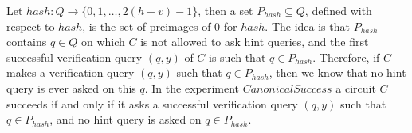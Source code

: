 
Let $hash:Q\rightarrow\{0,1,\dots, 2(h+v)-1\}$, then a set $P_{hash} \subseteq Q$,
defined with respect to $hash$, is the set of preimages of $0$ for $hash$.
The idea is that $P_{hash}$ contains $q \in Q$ on which $C$ is not allowed to ask hint queries,
and the first successful verification query $(q,y)$ of $C$ is such that $q \in P_{hash}$.
Therefore, if $C$ makes a verification query $(q,y)$ such that $q \in P_{hash}$, then we know that no hint query is ever asked on this $q$.
In the experiment $CanonicalSuccess$ a circuit $C$ succeeds if and only if it asks a successful verification query $(q,y)$ such that $q \in P_{hash}$,
and no hint query is asked on $q \in P_{hash}$.

